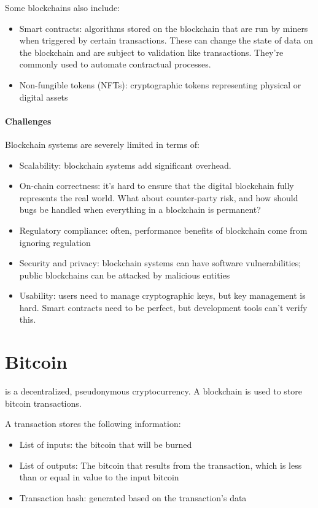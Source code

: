 Some blockchains also include:
\begin{itemize}
    \item Smart contracts: algorithms stored on the blockchain that are run by miners when triggered by certain transactions. These can change the state of data on the blockchain and are subject to validation like transactions. They're commonly used to automate contractual processes.
    \item Non-fungible tokens (NFTs): cryptographic tokens representing physical or digital assets
\end{itemize}

\paragraph{Challenges} Blockchain systems are severely limited in terms of:
\begin{itemize}
    \item Scalability: blockchain systems add significant overhead.
    \item On-chain correctness: it's hard to ensure that the digital blockchain fully represents the real world. What about counter-party risk, and how should bugs be handled when everything in a blockchain is permanent?
    \item Regulatory compliance: often, performance benefits of blockchain come from ignoring regulation
    \item Security and privacy: blockchain systems can have software vulnerabilities; public blockchains can be attacked by malicious entities
    \item Usability: users need to manage cryptographic keys, but key management is hard. Smart contracts need to be perfect, but development tools can't verify this.
\end{itemize}

\section{Bitcoin}

 is a decentralized, pseudonymous cryptocurrency. A blockchain is used to store bitcoin transactions.

A transaction stores the following information:
\begin{itemize}
    \item List of inputs: the bitcoin that will be burned
    \item List of outputs: The bitcoin that results from the transaction, which is less than or equal in value to the input bitcoin
    \item Transaction hash: generated based on the transaction's data
\end{itemize}

